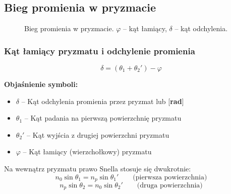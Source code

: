 \documentclass[12pt,a4paper]{article}
\newcommand{\oznaczenie}[2]{%
  \item $#1$ -- #2%
}
\begin{document}
\subsection{Bieg promienia w pryzmacie}

\begin{figure}[H]
\centering
{}
\caption{Bieg promienia w pryzmacie. $\varphi$ -- kąt łamiący, $\delta$ -- kąt odchylenia.}
\end{figure}

\subsubsection{Kąt łamiący pryzmatu i odchylenie promienia}

\begin{wzorbox}
\begin{equation}
  \delta = (\theta_1 + \theta_2') - \varphi
  \label{eq:odchylenie_pryzmatu}
\end{equation}
\end{wzorbox}

\begin{objasnbox}
\textbf{Objaśnienie symboli:}
\begin{itemize}[leftmargin=2em]
  \oznaczenie{\delta}{Kąt odchylenia promienia przez pryzmat \quad [°] lub [\textbf{rad}]}
  \oznaczenie{\theta_1}{Kąt padania na pierwszą powierzchnię pryzmatu \quad [°]}
  \oznaczenie{\theta_2'}{Kąt wyjścia z drugiej powierzchni pryzmatu \quad [°]}
  \oznaczenie{\varphi}{Kąt łamiący (wierzchołkowy) pryzmatu \quad [°]}
\end{itemize}
\end{objasnbox}

Na wewnątrz pryzmatu prawo Snella stosuje się dwukrotnie:
\begin{equation}
  n_0 \sin\theta_1 = n_p \sin\theta_1'
  \qquad\text{(pierwsza powierzchnia)}
\end{equation}
\begin{equation}
  n_p \sin\theta_2 = n_0 \sin\theta_2'
  \qquad\text{(druga powierzchnia)}
\end{equation}
\end{document}
